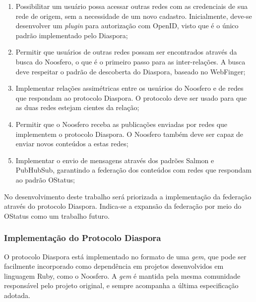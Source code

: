 \begin{enumerate}
  \item{Possibilitar um usuário possa acessar outras redes com as credenciais de sua
        rede de origem, sem a necessidade de um novo cadastro. Inicialmente, deve-se
        desenvolver um \textit{plugin} para autorização com OpenID, visto que é o
        único padrão implementado pelo Diaspora;}

  \item{Permitir que usuários de outras redes possam ser encontrados através da
        busca do Noosfero, o que é o primeiro passo para as inter-relações. A busca
        deve respeitar o padrão de descoberta do Diaspora, baseado no WebFinger;}

  \item{Implementar relações assimétricas entre os usuários do Noosfero e de redes
        que respondam ao protocolo Diaspora. O protocolo deve ser usado para que as
        duas redes estejam cientes da relação;}

  \item{Permitir que o Noosfero receba as publicações enviadas por redes que
        implementem o protocolo Diaspora. O Noosfero também deve ser capaz de enviar
        novos conteúdos a estas redes;}


  \item{Implementar o envio de mensagens através dos padrões Salmon e PubHubSub,
        garantindo a federação dos conteúdos com redes que respondam ao padrão
        OStatus;}
\end{enumerate}

No desenvolvimento deste trabalho será priorizada a implementação da federação
através do protocolo Diaspora. Indica-se a expansão da federação por meio do OStatus
como um trabalho futuro.

\subsubsection{Implementação do Protocolo Diaspora}

O protocolo Diaspora está implementado no formato de uma \textit{gem}, que pode ser
facilmente incorporado como dependência em projetos desenvolvidos em linguagem Ruby,
como o Noosfero. A \textit{gem} é mantida pela mesma comunidade responsável pelo
projeto original, e sempre acompanha a última especificação adotada.

